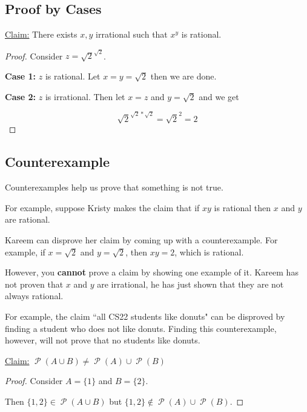 \documentclass[12pt,letterpaper]{article}
\newcommand{\claim}{\underline{Claim:} }
\newcommand\Pow{\ensuremath{\operatorname{\mathcal{P}}}}
\begin{document}
    \subsection{Proof by Cases}
        
    \begin{mdframed}
    \claim There exists $x,y$ irrational such that $x^y$ is rational.
    
   \begin{proof}
    
    Consider $z = \sqrt{2}^{\sqrt{2}}$.
    
    \textbf{Case 1:} $z$ is rational. Let $x = y = \sqrt{2}$ then we are done.
    
    \textbf{Case 2:} $z$ is irrational. Then let $x = z$ and $y = \sqrt{2}$ and we get
    
    \[\sqrt{2}^{\sqrt{2}*\sqrt{2}} = \sqrt{2}^2 = 2\]
    \end{proof}
    \end{mdframed}
    
    \subsection{Counterexample}
    
    Counterexamples help us prove that something is not true.

      For example, suppose Kristy makes the claim that if $xy$ is rational then $x$ and $y$ are rational.

      Kareem can disprove her claim by coming up with a counterexample. For example, if $x = \sqrt{2}$ and $y = \sqrt{2}$, then $xy = 2$, which is rational. 

      However, you \textbf{cannot} prove a claim by showing one example of it. Kareem has not proven that $x$ and $y$ are irrational, he has just shown that they are not always rational.

      For example, the claim ``all CS22 students like donuts" can be disproved by finding a student who does not like donuts. Finding this counterexample, however, will not prove that no students like donuts.
      
      
    \begin{mdframed}
    \claim $\Pow{(A\cup B)} \not= \Pow{(A)}\cup \Pow{(B)}$
    \begin{proof}

        Consider $A = \{1\}$ and $B = \{2\}$. 

        Then $\{1,2\} \in \Pow{(A\cup B)}$ but $\{1,2\} \not\in \Pow{(A)}\cup \Pow{(B)}$.
    \end{proof}    
    \end{mdframed}
\end{document}
